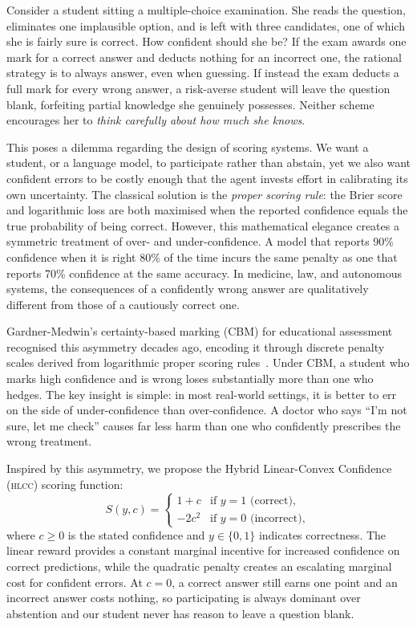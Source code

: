 \documentclass[11pt,a4paper]{article}
\newcommand{\hlcc}{\textsc{hlcc}}
\begin{document}
Consider a student sitting a multiple-choice examination.  She reads the
question, eliminates one implausible option, and is left with three
candidates, one of which she is fairly sure is correct.  How confident
should she be?  If the exam awards one mark for a correct answer and
deducts nothing for an incorrect one, the rational strategy is to always
answer, even when guessing.  If instead the exam deducts a full mark for
every wrong answer, a risk-averse student will leave the question blank,
forfeiting partial knowledge she genuinely possesses.  Neither scheme
encourages her to \emph{think carefully about how much she knows}.

This poses a dilemma regarding the design of scoring systems.  We want
a student, or a language model, to participate rather than abstain, yet
we also want confident errors to be costly enough that the agent invests
effort in calibrating its own uncertainty.  The classical
solution is the \emph{proper scoring rule}: the Brier score and
logarithmic loss are both maximised when the reported confidence equals
the true probability of being correct.  However, this mathematical
elegance creates a symmetric treatment of over- and under-confidence.
A model that reports 90\% confidence when it is right 80\% of the time
incurs the same penalty as one that reports 70\% confidence at the same
accuracy.  In medicine, law, and autonomous systems, the consequences
of a confidently wrong answer are qualitatively
different from those of a cautiously correct one.

Gardner-Medwin's certainty-based marking (CBM) for educational
assessment~\cite{gardnermedwin1995,gardnermedwin2006,mccallum2010gamedesign}
recognised this asymmetry decades ago, encoding it through discrete
penalty scales derived from logarithmic proper scoring
rules~\cite{good1952}.  Under CBM, a student who marks high confidence
and is wrong loses substantially more than one who hedges.  The key
insight is simple: in most real-world settings, it is better to err on
the side of under-confidence than over-confidence.  A doctor who says
``I'm not sure, let me check'' causes far less harm than one who
confidently prescribes the wrong treatment.

Inspired by this asymmetry, we propose the Hybrid Linear-Convex
Confidence (\hlcc{}) scoring function:
\begin{equation}
  S(y, c) =
  \begin{cases}
    1 + c    & \text{if } y = 1 \text{ (correct)}, \\
    -2c^{2}  & \text{if } y = 0 \text{ (incorrect)},
  \end{cases}
  \label{eq:hlcc-scoring}
\end{equation}
where $c \geq 0$ is the stated confidence and $y \in \{0,1\}$ indicates
correctness.  The linear reward provides a constant marginal incentive
for increased confidence on correct predictions, while the quadratic
penalty creates an escalating marginal cost for confident errors.  At
$c = 0$, a correct answer still earns one point and an incorrect answer
costs nothing, so participating is always dominant over abstention and
our student never has reason to leave a question blank.
\end{document}
